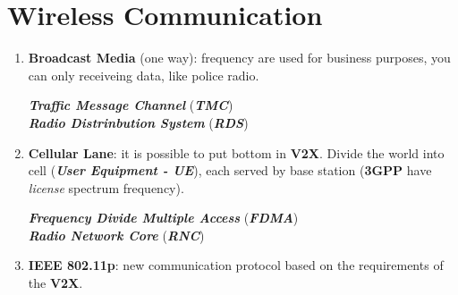 \section{Wireless Communication}
\begin{enumerate}[nosep]
    \item \textbf{Broadcast Media} (one way): frequency are used for business purposes, you can only receiveing data, like police radio.
    \begin{boxA}
        \centering
        \textbf{\textit{Traffic Message Channel}} (\textbf{\textit{TMC}}) \\
        \textbf{\textit{Radio Distrinbution System}} (\textbf{\textit{RDS}})
    \end{boxA}
    \item \textbf{Cellular Lane}: it is possible to put bottom in \textbf{V2X}. Divide the world into cell (\textbf{\textit{User Equipment - UE}}), each served by base station (\textbf{3GPP} have \textit{license} spectrum frequency).
    \begin{boxA}
        \centering
        \textbf{\textit{Frequency Divide Multiple Access}} (\textbf{\textit{FDMA}}) \\
        \textbf{\textit{Radio Network Core}} (\textbf{\textit{RNC}})
    \end{boxA}
    \item \textbf{IEEE 802.11p}: new communication protocol based on the requirements of the \textbf{V2X}.
\end{enumerate}

